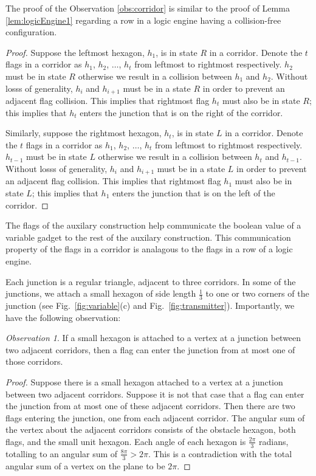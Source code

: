 \documentclass[10pt]{CSUNthesis}
\theoremstyle{plain}%
\theoremstyle{definition}
\theoremstyle{remark}
\newtheorem{observation}{Observation}
\begin{document}
The proof of the Observation \ref{obs:corridor} is similar to the proof of Lemma \ref{lem:logicEngine1} regarding a row in a logic engine having a collision-free configuration.
\begin{proof}
Suppose the leftmost hexagon, $h_1$, is in state $R$ in a corridor.
Denote the $t$ flags in a corridor as $h_1$, $h_2$, $\ldots$, $h_t$ from leftmost to rightmost respectively.
$h_2$ must be in state $R$ otherwise we result in a collision between $h_1$ and $h_2$.
Without losss of generality, $h_i$ and $h_{i+1}$ must be in a state $R$ in order to prevent an adjacent flag collision. 
This implies that rightmost flag $h_t$ must also be in state $R$; this implies that $h_t$ enters the junction that is on the right of the corridor.

Similarly, suppose the rightmost hexagon, $h_t$, is in state $L$ in a corridor.
Denote the $t$ flags in a corridor as $h_1$, $h_2$, $\ldots$, $h_t$ from leftmost to rightmost respectively.
$h_{t-1}$ must be in state $L$ otherwise we result in a collision between $h_t$ and $h_{t-1}$.
Without losss of generality, $h_i$ and $h_{i+1}$ must be in a state $L$ in order to prevent an adjacent flag collision. 
This implies that rightmost flag $h_1$ must also be in state $L$; this implies that $h_1$ enters the junction that is on the left of the corridor.
\end{proof}
The flags of the auxilary construction help communicate the boolean value of a variable gadget to the rest of the auxilary construction.
This communication property of the flags in a corridor is analagous to the flags in a row of a logic engine.

Each junction is a regular triangle, adjacent to three corridors. 
In some of the junctions, we attach a small hexagon of side length $\frac{1}{3}$ to one or two corners of the junction (see Fig.~\ref{fig:variable}(c) and Fig.~\ref{fig:transmitter}). 
Importantly, we have the following observation:
\begin{observation}\label{obs:junction}
If a small hexagon is attached to a vertex at a junction between two adjacent corridors, then a flag can enter the junction from at most one of those corridors.
\end{observation}
\begin{proof}
Suppose there is a small hexagon attached to a vertex at a junction between two adjacent corridors.
Suppose it is not that case that a flag can enter the junction from at most one of these adjacent corridors.
Then there are two flags entering the junction, one from each adjacent corridor.
The angular sum of the vertex about the adjacent corridors consists of the obstacle hexagon, both flags, and the small unit hexagon.
Each angle of each hexagon is $\frac{2 \pi}{3}$ radians, totalling to an angular sum of $\frac{8 \pi}{3} > 2 \pi$.
This is a contradiction with the total angular sum of a vertex on the plane to be $2 \pi$.
\end{proof}
\end{document}
